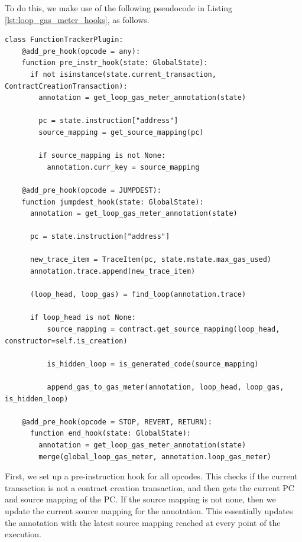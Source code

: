 To do this, we make use of the following pseudocode in Listing \ref{lst:loop_gas_meter_hooks},
as follows.

\begin{lstlisting}[language=Pseudocode, caption={Hooks implemented for loop gas meter plugin}, label={lst:loop_gas_meter_hooks}, basicstyle=\ttfamily\scriptsize]
  class FunctionTrackerPlugin:
    @add_pre_hook(opcode = any):
    function pre_instr_hook(state: GlobalState):
      if not isinstance(state.current_transaction, ContractCreationTransaction):
        annotation = get_loop_gas_meter_annotation(state)
        
        pc = state.instruction["address"]
        source_mapping = get_source_mapping(pc)

        if source_mapping is not None:
          annotation.curr_key = source_mapping

    @add_pre_hook(opcode = JUMPDEST):
    function jumpdest_hook(state: GlobalState):
      annotation = get_loop_gas_meter_annotation(state)
              
      pc = state.instruction["address"]
      
      new_trace_item = TraceItem(pc, state.mstate.max_gas_used)
      annotation.trace.append(new_trace_item)
      
      (loop_head, loop_gas) = find_loop(annotation.trace)
      
      if loop_head is not None:
          source_mapping = contract.get_source_mapping(loop_head, constructor=self.is_creation)
      
          is_hidden_loop = is_generated_code(source_mapping)
              
          append_gas_to_gas_meter(annotation, loop_head, loop_gas, is_hidden_loop)

    @add_pre_hook(opcode = STOP, REVERT, RETURN):
      function end_hook(state: GlobalState):
        annotation = get_loop_gas_meter_annotation(state)
        merge(global_loop_gas_meter, annotation.loop_gas_meter)
\end{lstlisting}

First, we set up a pre-instruction hook for all opcodes. This checks if the current transaction 
is not a contract creation transaction, and then gets the current PC and source mapping of the PC.
If the source mapping is not none, then we update the current source mapping for the annotation.
This essentially updates the annotation with the latest source mapping reached at every point of
the execution.

